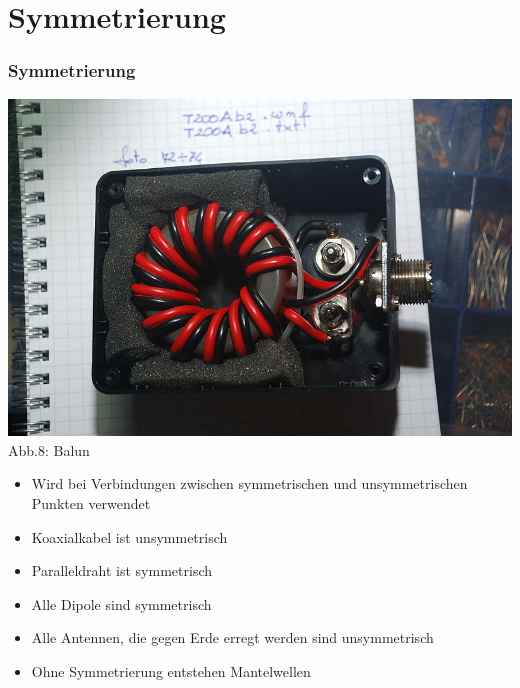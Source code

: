 \section*{Symmetrierung}
\begin{frame}
  \frametitle{Symmetrierung}
  \begin{minipage}{0.3\textwidth}
    \includegraphics[width=\textwidth,height=.8\textheight,keepaspectratio]{a10/balun.jpg}\\
    {\tiny Abb.8: Balun \cite{wp}}
  \end{minipage}
  \hspace{2mm}
  \begin{minipage}{0.5\textwidth}
    \begin{itemize}
      \item Wird bei Verbindungen zwischen symmetrischen und unsymmetrischen Punkten verwendet
      \item Koaxialkabel ist unsymmetrisch
      \item Paralleldraht ist symmetrisch
      \item Alle Dipole sind symmetrisch
      \item Alle Antennen, die gegen Erde erregt werden sind unsymmetrisch
      \item	Ohne Symmetrierung entstehen Mantelwellen
    \end{itemize}
  \end{minipage}
\end{frame}

